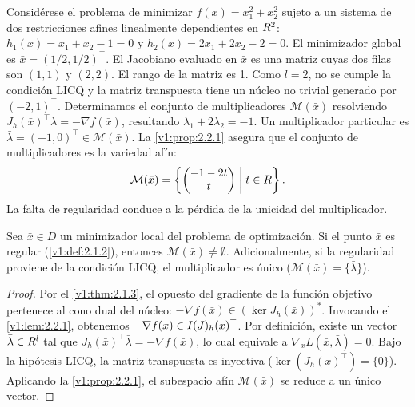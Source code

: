 \begin{example}\label{v1:exa:2.2.2}
 Considérese el problema de minimizar $f(x) = x_1^2 + x_2^2$ sujeto a un sistema de dos restricciones afines linealmente dependientes en $R^2$: $h_1(x) = x_1 + x_2 - 1 = 0$ y $h_2(x) = 2x_1 + 2x_2 - 2 = 0$. El minimizador global es $\bar{x} = (1/2, 1/2)^\top$. El Jacobiano evaluado en $\bar{x}$ es una matriz cuyas dos filas son $(1, 1)$ y $(2, 2)$. El rango de la matriz es 1. Como $l = 2$, no se cumple la condición LICQ y la matriz transpuesta tiene un núcleo no trivial generado por $(-2, 1)^\top$. Determinamos el conjunto de multiplicadores $\mathcal{M}(\bar{x})$ resolviendo $J_h(\bar{x})^\top \lambda = -\nabla f(\bar{x})$, resultando $\lambda_1 + 2\lambda_2 = -1$. Un multiplicador particular es $\bar{\lambda} = (-1, 0)^\top \in \mathcal{M}(\bar{x})$. La \cref{v1:prop:2.2.1} asegura que el conjunto de multiplicadores es la variedad afín:
 \[
 \mathcal{M}(\bar{x}) = \left\{ \begin{pmatrix} -1 - 2t \\ t \end{pmatrix} \mathrel{\bigg|} t \in R \right\}.
 \]
 La falta de regularidad conduce a la pérdida de la unicidad del multiplicador.
\end{example}

\begin{theorem}\label{v1:thm:2.2.1}
	Sea $\bar{x} \in D$ un minimizador local del problema de optimización. Si el punto $\bar{x}$ es regular (\cref{v1:def:2.1.2}), entonces $\mathcal{M}(\bar{x}) \neq \emptyset$. Adicionalmente, si la regularidad proviene de la condición LICQ, el multiplicador es único ($\mathcal{M}(\bar{x}) = \{\bar{\lambda}\}$).
\end{theorem}

\begin{proof}
	Por el \cref{v1:thm:2.1.3}, el opuesto del gradiente de la función objetivo pertenece al cono dual del núcleo: $-\nabla f(\bar{x}) \in (\ker J_h(\bar{x}))^*$. Invocando el \cref{v1:lem:2.2.1}, obtenemos $-\nabla f(\bar{x}) \in I (J)_h(\bar{x})^\top$. Por definición, existe un vector $\bar{\lambda} \in R^l$ tal que $J_h(\bar{x})^\top \bar{\lambda} = -\nabla f(\bar{x})$, lo cual equivale a $\nabla_x L(\bar{x}, \bar{\lambda}) = 0$. Bajo la hipótesis LICQ, la matriz transpuesta es inyectiva ($\ker(J_h(\bar{x})^\top) = \{0\}$). Aplicando la \cref{v1:prop:2.2.1}, el subespacio afín $\mathcal{M}(\bar{x})$ se reduce a un único vector.
\end{proof}


